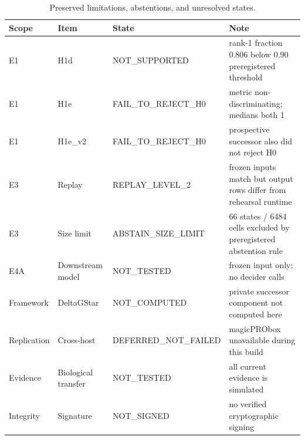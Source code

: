 \begin{table}[t]
\centering
\small
\begin{tabular}{llll}
\toprule
Scope & Item & State & Note \\
\midrule
E1 & H1d & NOT\_SUPPORTED & rank-1 fraction 0.806 below 0.90 preregistered threshold \\
E1 & H1e & FAIL\_TO\_REJECT\_H0 & metric non-discriminating; medians both 1 \\
E1 & H1e\_v2 & FAIL\_TO\_REJECT\_H0 & prospective successor also did not reject H0 \\
E3 & Replay & REPLAY\_LEVEL\_2 & frozen inputs match but output rows differ from rehearsal runtime \\
E3 & Size limit & ABSTAIN\_SIZE\_LIMIT & 66 states / 6484 cells excluded by preregistered abstention rule \\
E4A & Downstream model & NOT\_TESTED & frozen input only; no decider calls \\
Framework & DeltaGStar & NOT\_COMPUTED & private successor component not computed here \\
Replication & Cross-host & DEFERRED\_NOT\_FAILED & magicPRObox unavailable during this build \\
Evidence & Biological transfer & NOT\_TESTED & all current evidence is simulated \\
Integrity & Signature & NOT\_SIGNED & no verified cryptographic signing \\
\bottomrule
\end{tabular}
\caption{Preserved limitations, abstentions, and unresolved states.}
\label{tab:limitations}
\end{table}
